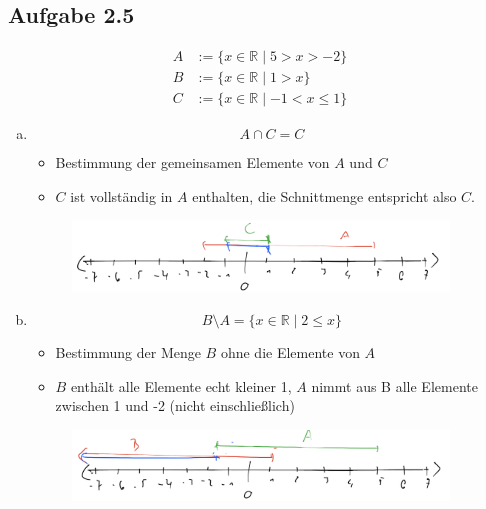 \documentclass{standalone}
\begin{document}
\subsection{Aufgabe 2.5}

\begin{align}
    A&:=\{x \in \mathbb{R} \mid 5 > x > -2\} \\
    B&:=\{x \in \mathbb{R} \mid 1 > x\} \\
    C&:=\{x \in \mathbb{R} \mid -1 < x \leq 1\}
\end{align}

\begin{enumerate}[a)]
    \item $$ A \cap C = C $$
    \begin{itemize}
        \item Bestimmung der gemeinsamen Elemente von $A$ und $C$
        \item $C$ ist vollständig in $A$ enthalten, die Schnittmenge entspricht also $C$.
    \end{itemize}
    \begin{figure}[htpb]
        \centering
        \includegraphics[width=10cm]{img/2_5_a}
    \end{figure}
    \FloatBarrier

    \item $$ B \setminus A = \{x \in \mathbb{R} \mid 2 \leq x\} $$
    \begin{itemize}
        \item Bestimmung der Menge $B$ ohne die Elemente von $A$
        \item $B$ enthält alle Elemente echt kleiner 1, $A$ nimmt aus B alle Elemente zwischen 1 und -2 (nicht einschließlich)
    \end{itemize}
    \begin{figure}[htpb]
        \centering
        \includegraphics[width=10cm]{img/2_5_b}
    \end{figure}
    \FloatBarrier
    

\end{enumerate}
\end{document}
